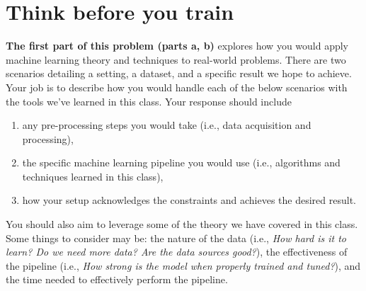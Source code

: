 \documentclass{article}
\begin{document}
\clearpage
\section*{Think before you train}
\begin{aprob} \textbf{The first part of this problem (parts a, b)} explores how you would apply machine learning theory and techniques to real-world problems. There are two scenarios detailing a setting, a dataset, and a specific result we hope to achieve. Your job is to describe how you would handle each of the below scenarios with the tools we’ve learned in this class. Your response should include
\begin{enumerate}[label=(\arabic*),topsep=0.2em,itemsep=-0.2em]
    \item any pre-processing steps you would take (i.e., data acquisition and processing),
    \item the specific machine learning pipeline you would use (i.e., algorithms and techniques learned in this class),
    \item how your setup acknowledges the constraints and achieves the desired result.
\end{enumerate}
You should also aim to leverage some of the theory we have covered in this class. Some things to consider may be: the nature of the data (i.e., \textit{How hard is it to learn? Do we need more data? Are the data sources good?}), the effectiveness of the pipeline (i.e., \textit{How strong is the model when properly trained and tuned?}), and the time needed to effectively perform the pipeline.



\end{aprob}
\end{document}
